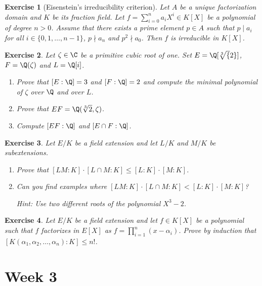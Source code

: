 \documentclass[a4paper,10pt,reqno]{amsart}
\newtheorem{ex}{Exercise}[section]
\begin{document}
\begin{ex} [Eisenstein's irreducibility criterion]
    Let $A$ be a unique factorization domain and $K$ be its fraction field.
    Let $f=\sum_{i=0}^n a_iX^i\in K[X]$ be a polynomial of degree $n>0$. 
    Assume that there exists a prime element $p\in A$ such that
    $p\mid a_i$ for all $i\in\{0,1,\dots,n-1\}$, $p\nmid a_n$ and
    $p^2\nmid a_0$. Then $f$ is irreducible in $K[X]$. 
\end{ex}


\begin{ex}
Let $\zeta\in\C$ be a primitive cubic root of one.
Set $E=\Q[\sqrt[3]{2}]$, $F=\Q(\zeta)$ and $L=\Q[i]$.
\begin{enumerate}[label=(\roman*)]
    \item Prove that $[E:\Q]=3$ and $[F:\Q]=2$ and compute the minimal polynomial of $\zeta$ over $\Q$ and over $L$.
    \item Prove that $EF=\Q(\sqrt[3]{2},\zeta)$.
    \item Compute $[EF:\Q]$ and $[E\cap F:\Q]$.
\end{enumerate}  
\end{ex}

\begin{ex}
    Let $E/K$ be a field extension and let $L/K$ and $M/K$ be subextensions.
    \begin{enumerate}[label=(\roman*)]
    \item Prove that $[LM : K ] \cdot [L \cap M : K] \leq [L:K] \cdot [M:K]$.
    \item Can you find examples where $[LM : K ] \cdot [L \cap M : K] < [L:K] \cdot [M:K]$?
    
    \noindent \textit{Hint:} Use two different roots of the polynomial $X^3 -2$.
    \end{enumerate}  
\end{ex}

\begin{ex}
    Let $E/K$ be a field extension and let $f \in K[X]$ be a polynomial such that $f$ factorizes in $E[X]$ as $f = \prod_{i=1}^n(x - \alpha_i)$. Prove by induction that $[K(\alpha_1,\alpha_2, \ldots, \alpha_n):K] \leq n!$.
\end{ex}

\newpage

\section{Week 3}
\end{document}
